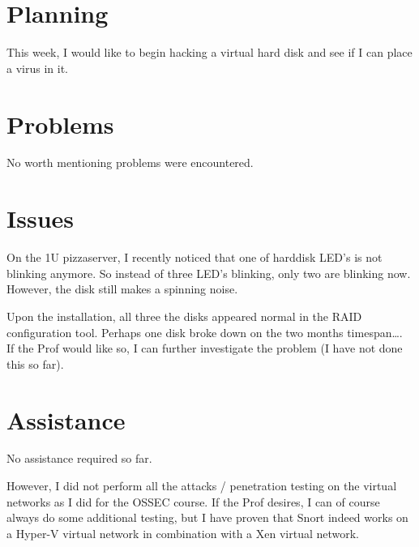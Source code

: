 \documentclass[11pt, a4paper]{article}
\begin{document}
\section*{Planning}

This week, I would like to begin hacking a virtual hard disk and see if I can place a virus in it.

\section*{Problems}

No worth mentioning problems were encountered.

\section*{Issues}

On the 1U pizzaserver, I recently noticed that one of harddisk LED's is not blinking anymore. So instead of three LED's blinking, only two are blinking now. However, the disk still makes a spinning noise.

Upon the installation, all three the disks appeared normal in the RAID configuration tool. Perhaps one disk broke down on the two months timespan\ldots .\\
If the Prof would like so, I can further investigate the problem (I have not done this so far).


\section*{Assistance}

No assistance required so far.

However, I did not perform all the attacks / penetration testing on the virtual networks as I did for the OSSEC course. If the Prof desires, I can of course always do some additional testing, but I have proven that Snort indeed works on a Hyper-V virtual network in combination with a Xen virtual network.
\end{document}
